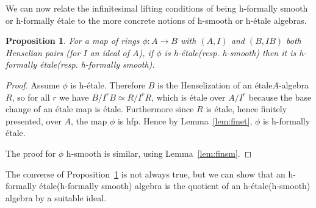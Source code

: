 \documentclass[12pt]{article}
\newcommand{\Et}{\'etale\xspace}
\newcommand{\hfp}{hfp\xspace}
\newcommand{\hetale}{h-\'etale\xspace}
\newcommand{\hfetale}{h-formally \'etale\xspace}
\newcommand{\hsmooth}{h-smooth\xspace}
\newcommand{\hfsmooth}{h-formally smooth\xspace}
\newtheorem{proposition}[theorem]{Proposition}
\theoremstyle{definition}
\numberwithin{equation}{subsection}
\begin{document}
We can now relate the infinitesimal lifting conditions  of being \hfsmooth or \hfetale  to the more concrete notions of \hsmooth  or \hetale algebras.

\begin{proposition}\label{prop:hetisformal} For a map of rings $\phi: A \to B$ with $(A,I)$ and $(B,IB)$ both Henselian pairs (for $I$ an ideal of $A$), if $\phi$ is \hetale (resp. \hsmooth) then it is \hfetale (resp. \hfsmooth).
\end{proposition}
\begin{proof} 
Assume $\phi$ is \hetale. Therefore $B$ is the Henselization of an \Et $A$-algebra $R$, so for all $r$ we have $B/I^rB \simeq R/I^rR$, which is \Et over $A/I^r$ because the base change of an \Et map is \Et. Furthermore since $R$ is \Et, hence finitely presented, over $A$, the map $\phi$ is \hfp. Hence by Lemma~\ref{lem:finet}, $\phi$ is \hfetale. 

The proof for $\phi$ \hsmooth is similar, using Lemma~\ref{lem:finsm}.\end{proof}

The converse of Proposition~\ref{prop:hetisformal} is not always true, but we can show that an \hfetale (\hfsmooth) algebra is the quotient of an \hetale (\hsmooth) algebra by a suitable ideal.
\end{document}
